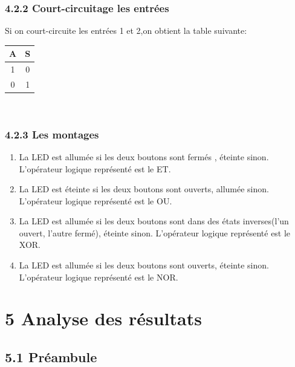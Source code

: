 \documentclass{report}
\begin{document}
\subsubsection*{4.2.2 Court-circuitage les entr\'ees}
\hspace*{1,5cm} Si on court-circuite les entr\'ees 1 et 2,on obtient la table
suivante:\\
\begin{tabular}{|c|c|}
\hline
A & S \\
\hline
1&0\\
0&1\\
\hline
\end{tabular}\\
\subsubsection*{4.2.3 Les montages}
\begin{enumerate}
\item La LED est allum\'ee si les deux boutons sont ferm\'es , \'eteinte sinon. L'opérateur logique représenté est le ET.
\item La LED est \'eteinte si les deux boutons sont ouverts, allum\'ee sinon. L'opérateur logique représenté est le OU.
\item La LED est allum\'ee si les deux boutons sont dans des \'etats inverses(l'un ouvert, l'autre ferm\'e), \'eteinte sinon. L'opérateur logique représenté est le XOR.
\item La LED est allum\'ee si les deux boutons sont ouverts, \'eteinte sinon. L'opérateur logique représenté est le NOR.
\end{enumerate}
\newpage

\section*{5 Analyse des r\'esultats}
\subsection*{5.1 Préambule}
\end{document}
